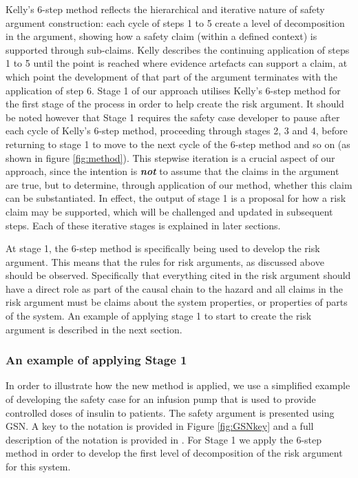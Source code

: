 Kelly's 6-step method reflects the hierarchical and iterative nature of safety argument construction: each cycle of steps 1 to 5 create a level of decomposition in the argument, showing how a safety claim (within a defined context) is supported through sub-claims. Kelly describes the continuing application of steps 1 to 5 until the point is reached where evidence artefacts can support a claim, at which point the development of that part of the argument terminates with the application of step 6. Stage 1 of our approach utilises Kelly's 6-step method for the first stage of the process in order to help create the risk argument. It should be noted however that Stage 1 requires the safety case developer to pause after each cycle of Kelly's 6-step method, proceeding through stages 2, 3 and 4, before returning to stage 1 to move to the next cycle of the 6-step method and so on (as shown in figure \ref{fig:method}). This stepwise iteration is a crucial aspect of our approach, since the intention is \textbf{\textit{not}} to assume that the claims in the argument are true, but to determine, through application of our method, whether this claim can be substantiated. In effect, the output of stage 1 is a proposal for how a risk claim may be supported, which will be challenged and updated in subsequent steps. Each of these iterative stages is explained in later sections.

At stage 1, the 6-step method is specifically being used to develop the risk argument. This means that the rules for risk arguments, as discussed above should be observed. Specifically that everything cited in the risk argument should have a direct role as part of the causal chain to the hazard and all claims in the risk argument must be claims about the system properties, or properties of parts of the system. An example of applying stage 1 to start to create the risk argument is described in the next section.

\subsubsection{An example of applying Stage 1}

In order to illustrate how the new method is applied, we use a simplified example of developing the safety case for an infusion pump that is used to provide controlled doses of insulin to patients. The safety argument is presented using GSN. A key to the notation is provided in Figure \ref{fig:GSNkey} and a full description of the notation is provided in \cite{group2021a}. For Stage 1 we apply the 6-step method in order to develop the first level of decomposition of the risk argument for this system.

